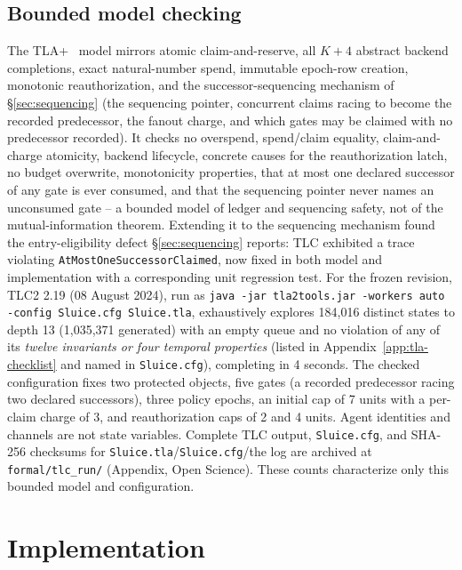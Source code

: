 \documentclass[conference,compsoc]{IEEEtran}
\newcommand{\rev}[1]{#1} %
\begin{document}
{\subsection{Bounded model checking}
\label{sec:mechanization} The TLA+\rev{~\cite{lamport2002}} model mirrors atomic claim-and-reserve,
all $K+4$ abstract backend completions, exact natural-number spend,
immutable epoch-row creation, monotonic reauthorization, and the
successor-sequencing mechanism of \S\ref{sec:sequencing} (the sequencing
pointer, concurrent claims racing to become the recorded predecessor, the
fanout charge, and which gates may be claimed with no predecessor
recorded). It checks no overspend, spend/claim equality, claim-and-charge
atomicity, backend lifecycle, concrete causes for the reauthorization
latch, no budget overwrite, monotonicity properties, that at most one
declared successor of any gate is ever consumed, and that the sequencing
pointer never names an unconsumed gate -- a bounded model of ledger and
sequencing safety, not of the mutual-information theorem. Extending it to
the sequencing mechanism found the entry-eligibility defect
\S\ref{sec:sequencing} reports: TLC exhibited a trace violating
\texttt{AtMostOneSuccessorClaimed}, now fixed in both model and
implementation with a corresponding unit regression test. For the frozen
revision, TLC2 2.19 (08 August 2024), run as \texttt{java -jar
tla2tools.jar -workers auto -config Sluice.cfg Sluice.tla}, exhaustively
explores 184{,}016 distinct states to depth 13 (1{,}035{,}371 generated)
with an empty queue and no violation of any of its \emph{twelve
invariants or four temporal properties} (listed in Appendix~\ref{app:tla-checklist} and named in
\texttt{Sluice.cfg}), completing in 4
seconds. The checked configuration fixes two protected objects, five gates (a recorded predecessor racing two declared successors), three policy epochs, an initial cap of 7 units with a per-claim charge of 3, and reauthorization caps of 2 and 4 units. Agent identities and channels are not state variables. Complete TLC output, \texttt{Sluice.cfg}, and SHA-256 checksums for
\texttt{Sluice.tla}/\texttt{Sluice.cfg}/the log are archived at
\texttt{formal/tlc\_run/} (Appendix, Open Science). These counts
characterize only this bounded model and configuration.
\FloatBarrier



}


\section{Implementation}
\label{sec:impl}
\end{document}

